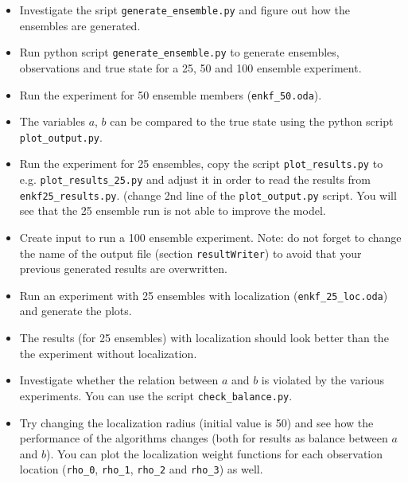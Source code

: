 \begin{itemize}
\item Investigate the sript {\tt generate\_ensemble.py} and figure out how the ensembles are generated.
\item Run python script {\tt generate\_ensemble.py} to generate ensembles, observations and true state for a 25, 50 and 100 ensemble experiment.  
\item Run the experiment for 50 ensemble members ({\tt enkf\_50.oda}).
\item The variables $a$, $b$ can be compared to the true state using the python script {\tt plot\_output.py}.
\item Run the experiment for 25 ensembles, copy the script {\tt plot\_results.py} to e.g. {\tt plot\_results\_25.py} and adjust it in order to read the results from {\tt enkf25\_results.py}.
(change 2nd line of the {\tt plot\_output.py} script. You will see that the 25 ensemble run is not able to improve the model.
\item Create input to run a 100 ensemble experiment. Note: do not forget to change the name of the output file (section {\tt resultWriter}) 
to avoid that your previous generated results are overwritten. 
\item Run an experiment with 25 ensembles with localization ({\tt enkf\_25\_loc.oda}) and generate the plots.
\item The results (for 25 ensembles) with localization should look better than the the experiment without localization.
\item Investigate whether the relation between $a$ and $b$ is violated by the various experiments. You can use the script {\tt check\_balance.py}.
\item Try changing the localization radius (initial value is 50) and see how the performance of the algorithms changes (both for results as balance between $a$ and $b$). You can plot the localization weight functions for each observation location ({\tt rho\_0}, {\tt rho\_1}, {\tt rho\_2} and {\tt rho\_3}) as well.
\end{itemize}








